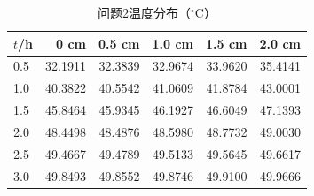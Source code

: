 \begin{table}[!htbp]\centering
\caption{问题2温度分布（$^\circ$C）}
\begin{tabular}{lrrrrr}\toprule
$t$/h & 0 cm & 0.5 cm & 1.0 cm & 1.5 cm & 2.0 cm\\\midrule
0.5 & 32.1911 & 32.3839 & 32.9674 & 33.9620 & 35.4141\\
1.0 & 40.3822 & 40.5542 & 41.0609 & 41.8784 & 43.0001\\
1.5 & 45.8464 & 45.9345 & 46.1927 & 46.6049 & 47.1393\\
2.0 & 48.4498 & 48.4876 & 48.5980 & 48.7732 & 49.0030\\
2.5 & 49.4667 & 49.4789 & 49.5133 & 49.5645 & 49.6617\\
3.0 & 49.8493 & 49.8552 & 49.8746 & 49.9100 & 49.9666\\
\bottomrule\end{tabular}\end{table}
